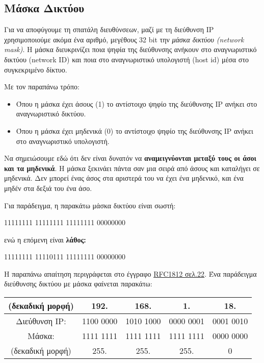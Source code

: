 %
%
\subsection{Μάσκα Δικτύου}

Για να αποφύγουμε τη σπατάλη διευθύνσεων, μαζί με τη διεύθυνση IP χρησιμοποιούμε ακόμα ένα αριθμό, μεγέθους 32 bit την \emph{μάσκα δικτύου (network mask)}. Η μάσκα διευκρινίζει ποια ψηφία της διεύθυνσης ανήκουν στο αναγνωριστικό δικτύου (network ID) και ποια στο αναγνωριστικό υπολογιστή (host id) μέσα στο συγκεκριμένο δίκτυο.

Με τον παραπάνω τρόπο:

\begin{itemize}
\item Όπου η μάσκα έχει άσους (1) το αντίστοιχο ψηφίο της διεύθυνσης IP ανήκει στο αναγνωριστικό δικτύου.
\item Όπου η μάσκα έχει μηδενικά (0) το αντίστοιχο ψηφίο της διεύθυνσης IP ανήκει στο αναγνωριστικό υπολογιστή.
\end{itemize}

Να σημειώσουμε εδώ ότι δεν είναι δυνατόν να \textbf{αναμειγνύονται μεταξύ τους οι άσοι και τα μηδενικά}. Η μάσκα ξεκινάει πάντα σαν μια σειρά από άσους και καταλήγει σε μηδενικά. Δεν μπορεί ένας άσος στα αριστερά του να έχει ένα μηδενικό, και ένα μηδέν στα δεξιά του ένα άσο.

Για παράδειγμα, η παρακάτω μάσκα δικτύου είναι σωστή:

\begin{center}
11111111 11111111 11111111 00000000
\end{center}

ενώ η επόμενη είναι \textbf{λάθος:}

\begin{center}
11111111 11110111 11111111 00000000
\end{center}

Η παραπάνω απαίτηση περιγράφεται στο έγγραφο \href{https://tools.ietf.org/html/rfc1812#section-2.2.5.1}{RFC1812 σελ.22}. Ένα παράδειγμα διεύθυνσης δικτύου με μάσκα φαίνεται παρακάτω:

\begin{center}
\small
\ttfamily
\begin{tabular}{|c|c|c|c|c|}
\hline
(δεκαδική μορφή) & 192. & 168. & 1. & 18. \\
\hline
Διεύθυνση IP: & 1100 0000 & 1010 1000 & 0000 0001 & 0001 0010 \\
\hline
Μάσκα: & 1111 1111 & 1111 1111 & 1111 1111 & 0000 0000\\
\hline
(δεκαδική μορφή) & 255. & 255. & 255. & 0 \\
\hline
\end{tabular}
\normalfont
\end{center}

